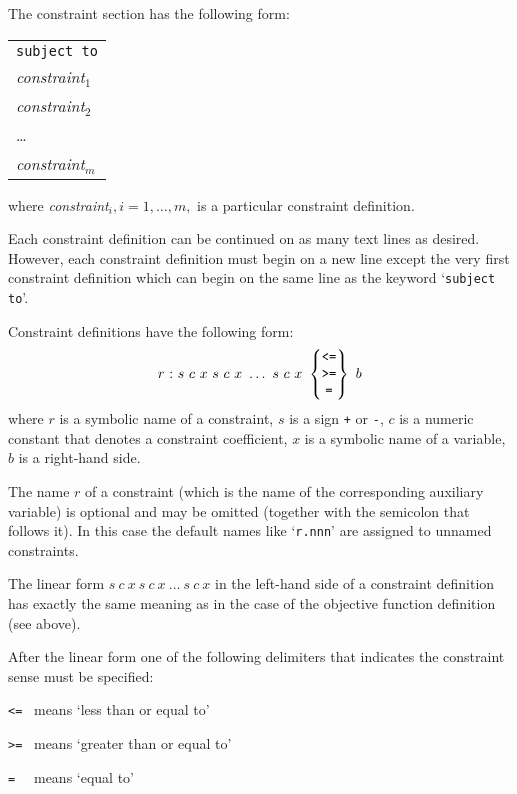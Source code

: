 The constraint section has the following form:

\begin{center}
\begin{tabular}{l}
\verb|subject to| \\
{\it constraint}$_1$ \\
{\it constraint}$_2$ \\
\hspace{20pt}\dots \\
{\it constraint}$_m$ \\
\end{tabular}
\end{center}

\noindent where {\it constraint}$_i, i=1,\dots,m,$ is a particular
constraint definition.

Each constraint definition can be continued on as many text lines as
desired. However, each constraint definition must begin on a new line
except the very first constraint definition which can begin on the same
line as the keyword `\verb|subject to|'.

Constraint definitions have the following form:
$$
r\ {\tt:}\ s\ c\ x\ s\ c\ x\ \dots\ s\ c\ x
\ \left\{
\begin{array}{@{}c@{}}
\mbox{\tt<=} \\ \mbox{\tt>=} \\ \mbox{\tt=}
\end{array}
\right\}\ b
$$
where $r$ is a symbolic name of a constraint, $s$ is a sign \verb|+| or
\verb|-|, $c$ is a numeric constant that denotes a constraint
coefficient, $x$ is a symbolic name of a variable, $b$ is a right-hand
side.

The name $r$ of a constraint (which is the name of the corresponding
auxiliary variable) is optional and may be omitted (together with the
semicolon that follows it). In this case the default names like
`\verb|r.nnn|' are assigned to unnamed constraints.

The linear form $s\ c\ x\ s\ c\ x\ \dots\ s\ c\ x$ in the left-hand
side of a constraint definition has exactly the same meaning as in the
case of the objective function definition (see above).

After the linear form one of the following delimiters that indicates
the constraint sense must be specified:

\verb|<=| \ means `less than or equal to'

\verb|>=| \ means `greater than or equal to'

\verb|= | \ means `equal to'


